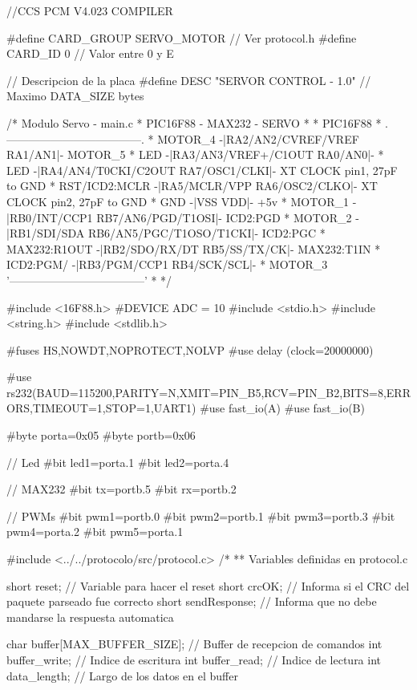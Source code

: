 {\scriptsize
\begin{verbatimtab}
//CCS PCM V4.023 COMPILER

#define CARD_GROUP	SERVO_MOTOR	// Ver protocol.h
#define CARD_ID		0			// Valor entre 0 y E

// Descripcion de la placa
#define DESC		"SERVOR CONTROL - 1.0" // Maximo DATA_SIZE bytes

/* Modulo Servo - main.c
 * PIC16F88 - MAX232 - SERVO
 *
 *                               PIC16F88
 *                .------------------------------------.
 *       MOTOR_4 -|RA2/AN2/CVREF/VREF           RA1/AN1|- MOTOR_5
 *           LED -|RA3/AN3/VREF+/C1OUT          RA0/AN0|- 
 *           LED -|RA4/AN4/T0CKI/C2OUT    RA7/OSC1/CLKI|- XT CLOCK pin1, 27pF to GND
 * RST/ICD2:MCLR -|RA5/MCLR/VPP           RA6/OSC2/CLKO|- XT CLOCK pin2, 27pF to GND
 *           GND -|VSS                              VDD|- +5v
 *       MOTOR_1 -|RB0/INT/CCP1       RB7/AN6/PGD/T1OSI|- ICD2:PGD
 *       MOTOR_2 -|RB1/SDI/SDA  RB6/AN5/PGC/T1OSO/T1CKI|- ICD2:PGC
 *  MAX232:R1OUT -|RB2/SDO/RX/DT           RB5/SS/TX/CK|- MAX232:T1IN
 *     ICD2:PGM/ -|RB3/PGM/CCP1             RB4/SCK/SCL|- 
 *     MOTOR_3    '------------------------------------'
 *    
 */

#include <16F88.h>
#DEVICE ADC = 10
#include <stdio.h>
#include <string.h>
#include <stdlib.h>

#fuses HS,NOWDT,NOPROTECT,NOLVP
#use delay (clock=20000000)

#use rs232(BAUD=115200,PARITY=N,XMIT=PIN_B5,RCV=PIN_B2,BITS=8,ERRORS,TIMEOUT=1,STOP=1,UART1)
#use fast_io(A)
#use fast_io(B)

#byte porta=0x05
#byte portb=0x06

// Led
#bit led1=porta.1
#bit led2=porta.4

// MAX232
#bit tx=portb.5
#bit rx=portb.2

// PWMs
#bit pwm1=portb.0
#bit pwm2=portb.1
#bit pwm3=portb.3
#bit pwm4=porta.2
#bit pwm5=porta.1

#include <../../protocolo/src/protocol.c>
/*
** Variables definidas en protocol.c

short reset; // Variable para hacer el reset
short crcOK; // Informa si el CRC del paquete parseado fue correcto
short sendResponse; // Informa que no debe mandarse la respuesta automatica

char buffer[MAX_BUFFER_SIZE];	// Buffer de recepcion de comandos
int buffer_write;				// Indice de escritura
int buffer_read;				// Indice de lectura
int data_length;				// Largo de los datos en el buffer


\end{verbatimtab}}
